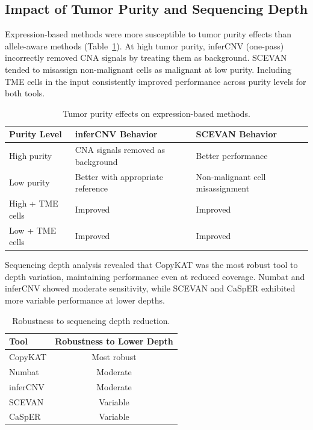 \documentclass[11pt]{article}
\begin{document}
\subsection{Impact of Tumor Purity and Sequencing Depth}

Expression-based methods were more susceptible to tumor purity effects than allele-aware methods (Table~\ref{tab:purity}). At high tumor purity, inferCNV (one-pass) incorrectly removed CNA signals by treating them as background. SCEVAN tended to misassign non-malignant cells as malignant at low purity. Including TME cells in the input consistently improved performance across purity levels for both tools.

\begin{table}[H]
\centering
\caption{Tumor purity effects on expression-based methods.}
\label{tab:purity}
\begin{tabular}{lll}
\toprule
Purity Level & inferCNV Behavior & SCEVAN Behavior \\
\midrule
High purity & CNA signals removed as background & Better performance \\
Low purity & Better with appropriate reference & Non-malignant cell misassignment \\
High + TME cells & Improved & Improved \\
Low + TME cells & Improved & Improved \\
\bottomrule
\end{tabular}
\end{table}

Sequencing depth analysis revealed that CopyKAT was the most robust tool to depth variation, maintaining performance even at reduced coverage. Numbat and inferCNV showed moderate sensitivity, while SCEVAN and CaSpER exhibited more variable performance at lower depths.

\begin{table}[H]
\centering
\caption{Robustness to sequencing depth reduction.}
\label{tab:depth}
\begin{tabular}{lc}
\toprule
Tool & Robustness to Lower Depth \\
\midrule
CopyKAT & Most robust \\
Numbat & Moderate \\
inferCNV & Moderate \\
SCEVAN & Variable \\
CaSpER & Variable \\
\bottomrule
\end{tabular}
\end{table}
\end{document}
